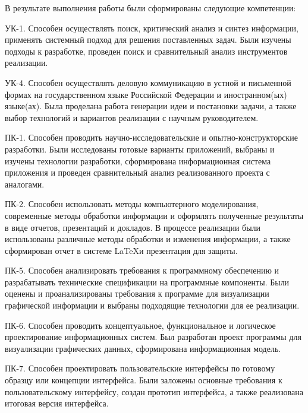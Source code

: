 В результате выполнения работы были сформированы следующие компетенции:

УК-1. Способен осуществлять поиск, критический анализ и синтез информации, применять системный подход для решения поставленных задач. Были изучены подходы к разработке, проведен поиск и сравнительный анализ инструментов реализации.

УК-4. Способен осуществлять деловую коммуникацию в устной и письменной формах на государственном языке Российской Федерации и иностранном(ых) языке(ах). Была проделана работа генерации идеи и постановки задачи, а также выбор технологий и вариантов реализации с научным руководителем.

ПК-1. Способен проводить научно-исследовательские и опытно-конструкторские разработки. Были исследованы готовые варианты приложений, выбраны и изучены технологии разработки, сформирована информационная система приложения и проведен сравнительный анализ реализованного проекта с аналогами.

ПК-2. Способен использовать методы компьютерного моделирования, современные методы обработки информации и оформлять полученные результаты в виде отчетов, презентаций и докладов. В процессе реализации были использованы различные методы обработки и изменения информации, а также сформирован отчет в системе \LaTeX и презентация для защиты.

ПК-5. Способен анализировать требования к программному обеспечению и разрабатывать технические спецификации на программные компоненты. Были оценены и проанализированы требования к программе для визуализации графической информации и выбраны подходящие технологии для ее реализации.

ПК-6. Способен проводить концептуальное, функциональное и логическое проектирование информационных систем. Был разработан проект программы для визуализации графических данных, сформирована информационная модель.

ПК-7. Способен проектировать пользовательские интерфейсы по готовому образцу или концепции интерфейса. Были заложены основные требования к пользовательскому интерфейсу, создан прототип интерфейса, а также реализована итоговая версия интерфейса.